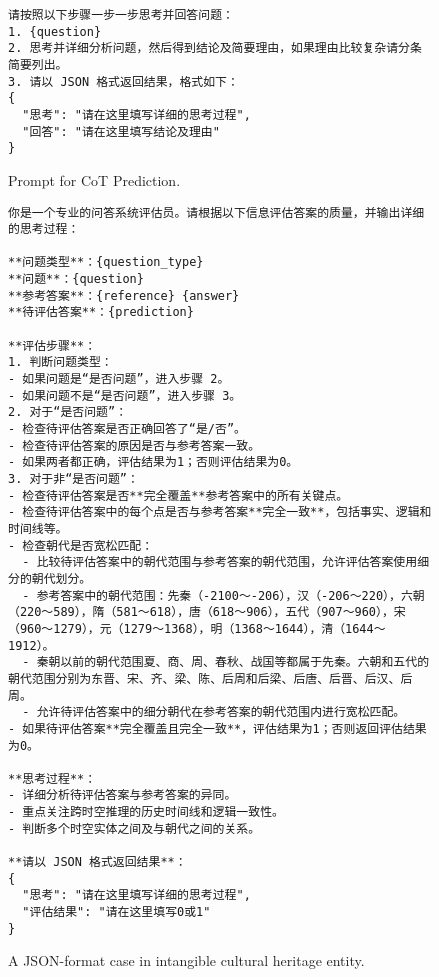 \begin{figure}[H]
\begin{tcolorbox}[title={\textbf{\small Prompt for CoT Prediction}}, colback=whitesmoke, colframe=lightred, boxrule=2pt, arc=0mm]
{\small
\begin{verbatim}
请按照以下步骤一步一步思考并回答问题：
1. {question}
2. 思考并详细分析问题，然后得到结论及简要理由，如果理由比较复杂请分条简要列出。
3. 请以 JSON 格式返回结果，格式如下：
{
  "思考": "请在这里填写详细的思考过程",
  "回答": "请在这里填写结论及理由"
}
\end{verbatim}
}
\end{tcolorbox}
\caption{Prompt for CoT Prediction.}
\label{fig:cot_prompt}
\end{figure}



\begin{figure*}[t]
\begin{tcolorbox}[title={\textbf{\small Prompt of Evaluator}}, colback=whitesmoke, colframe=lightred, boxrule=2pt, arc=0mm]
{\small
\begin{verbatim}
你是一个专业的问答系统评估员。请根据以下信息评估答案的质量，并输出详细的思考过程：

**问题类型**：{question_type}
**问题**：{question}
**参考答案**：{reference} {answer}
**待评估答案**：{prediction}

**评估步骤**：
1. 判断问题类型：
- 如果问题是“是否问题”，进入步骤 2。
- 如果问题不是“是否问题”，进入步骤 3。
2. 对于“是否问题”：
- 检查待评估答案是否正确回答了“是/否”。
- 检查待评估答案的原因是否与参考答案一致。
- 如果两者都正确，评估结果为1；否则评估结果为0。
3. 对于非“是否问题”：
- 检查待评估答案是否**完全覆盖**参考答案中的所有关键点。
- 检查待评估答案中的每个点是否与参考答案**完全一致**，包括事实、逻辑和时间线等。
- 检查朝代是否宽松匹配：
  - 比较待评估答案中的朝代范围与参考答案的朝代范围，允许评估答案使用细分的朝代划分。
  - 参考答案中的朝代范围：先秦（-2100～-206），汉（-206～220），六朝（220～589），隋（581～618），唐（618～906），五代（907～960），宋（960～1279），元（1279～1368），明（1368～1644），清（1644～1912）。
  - 秦朝以前的朝代范围夏、商、周、春秋、战国等都属于先秦。六朝和五代的朝代范围分别为东晋、宋、齐、梁、陈、后周和后梁、后唐、后晋、后汉、后周。
  - 允许待评估答案中的细分朝代在参考答案的朝代范围内进行宽松匹配。
- 如果待评估答案**完全覆盖且完全一致**，评估结果为1；否则返回评估结果为0。

**思考过程**：
- 详细分析待评估答案与参考答案的异同。
- 重点关注跨时空推理的历史时间线和逻辑一致性。
- 判断多个时空实体之间及与朝代之间的关系。

**请以 JSON 格式返回结果**：
{
  "思考": "请在这里填写详细的思考过程", 
  "评估结果": "请在这里填写0或1"
}
\end{verbatim}
}
\end{tcolorbox}
\caption{A JSON-format case in intangible cultural heritage entity.}
\label{fig:eval_prompt}
\end{figure*}


